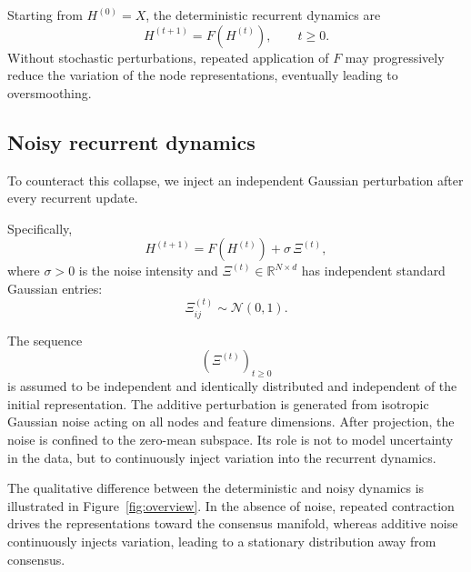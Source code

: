 \documentclass{article}
\begin{document}
Starting from
\(
H^{(0)}=X
\),
the deterministic recurrent dynamics are
\[
H^{(t+1)}
=
F(H^{(t)}),
\qquad
t\ge0.
\]
Without stochastic perturbations,
repeated application of $F$
may progressively reduce the variation of the node representations,
eventually leading to oversmoothing.

\subsection{Noisy recurrent dynamics}

To counteract this collapse,
we inject an independent Gaussian perturbation after every recurrent
update.

Specifically,
\[
H^{(t+1)}
=
F(H^{(t)})
+
\sigma\,\Xi^{(t)},
\]
where
\(
\sigma>0
\)
is the noise intensity and
\(
\Xi^{(t)}
\in
\mathbb{R}^{N\times d}
\)
has independent standard Gaussian entries:
\[
\Xi^{(t)}_{ij}
\sim
\mathcal N(0,1).
\]

The sequence
\[
(\Xi^{(t)})_{t\ge0}
\]
is assumed to be independent and identically distributed and independent
of the initial representation.
The additive perturbation is generated from isotropic Gaussian noise acting on all nodes and feature dimensions. After projection, the noise is confined to the zero-mean subspace.
Its role is not to model uncertainty in the data,
but to continuously inject variation into the recurrent dynamics.

The qualitative difference between the deterministic and noisy dynamics is illustrated in Figure~\ref{fig:overview}. In the absence of noise, repeated contraction drives the representations toward the consensus manifold, whereas additive noise continuously injects variation, leading to a stationary distribution away from consensus.
\end{document}
